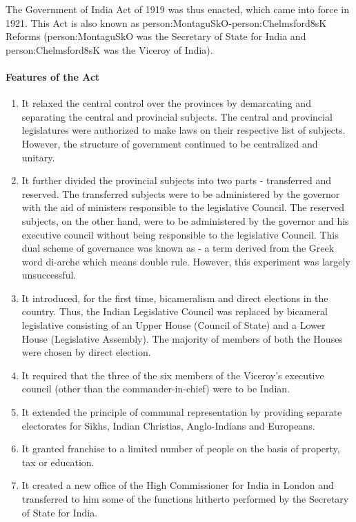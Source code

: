 The Government of India Act of 1919 was thus enacted, which came into force in 1921. This Act is also known as \gls{person:MontaguSkO}-\gls{person:Chelmsford8sK} Reforms (\gls{person:MontaguSkO} was the Secretary of State for India and \gls{person:Chelmsford8sK} was the Viceroy of India).

\paragraph{Features of the Act}
\begin{enumerate}
  \item It relaxed the central control over the provinces by demarcating and separating the central and provincial subjects. The central and provincial legislatures were authorized to make laws on their respective list of subjects. However, the structure of government continued to be
  centralized and unitary.
  \item It further divided the provincial subjects into two parts - transferred and reserved. The transferred subjects were to be administered by the governor with the aid of ministers responsible to the legislative Council. The reserved subjects, on the other hand, were to be administered by the governor and his executive council without being responsible to the legislative Council. This dual scheme of governance was known as
    - a term derived from the Greek word di-arche which means double rule. However, this experiment was largely unsuccessful.
  \item It introduced, for the first time, bicameralism and direct elections in the country. Thus, the Indian Legislative Council was replaced by bicameral legislative consisting of an Upper House (Council of State) and a Lower House (Legislative Assembly). The majority of members of both the Houses were chosen by direct election.
  \item It required that the three of the six members of the Viceroy's executive council (other than the commander-in-chief) were to be Indian.
  \item It extended the principle of communal representation by providing separate electorates for Sikhs, Indian Christias, Anglo-Indians and Europeans.
  \item It granted franchise to a limited number of people on the basis of property, tax or education.
  \item It created a new office of the High Commissioner for India in London and transferred to him some of the functions hitherto performed by the Secretary of State for India.

\end{enumerate}

